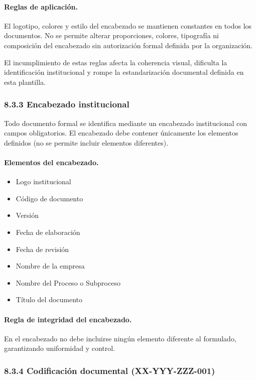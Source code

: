 \documentclass{encabezado}
\begin{document}
\paragraph{Reglas de aplicación.}
El logotipo, colores y estilo del encabezado se mantienen constantes en todos los documentos. No se permite alterar proporciones, colores, tipografía ni composición del encabezado sin autorización formal definida por la organización.

El incumplimiento de estas reglas afecta la coherencia visual, dificulta la identificación institucional y rompe la estandarización documental definida en esta plantilla.

\subsubsection*{8.3.3 Encabezado institucional}

Todo documento formal se identifica mediante un encabezado institucional con campos obligatorios. El encabezado debe contener únicamente los elementos definidos (no se permite incluir elementos diferentes).

\paragraph{Elementos del encabezado.}
\begin{itemize}
    \item Logo institucional
    \item Código de documento
    \item Versión
    \item Fecha de elaboración
    \item Fecha de revisión
    \item Nombre de la empresa
    \item Nombre del Proceso o Subproceso
    \item Título del documento
\end{itemize}

\paragraph{Regla de integridad del encabezado.}
En el encabezado no debe incluirse ningún elemento diferente al formulado, garantizando uniformidad y control.

\subsubsection*{8.3.4 Codificación documental (XX-YYY-ZZZ-001)}
\end{document}
